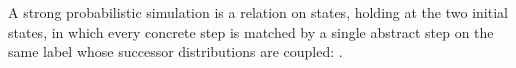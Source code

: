 \begin{definition}
  \label{def:strongsim}
  \leanok
  A strong probabilistic simulation is a relation on states, holding at the two initial states, in which every concrete step is matched by a single abstract step on the same label whose successor distributions are coupled: .
\end{definition}
